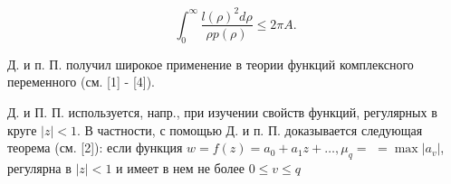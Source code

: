 \documentclass[10pt]{article}
\begin{document}
\[

\int_{0}^{\infty} \frac{l(\rho)^{2} d \rho}{\rho p(\rho)} \leqslant 2 \pi A .

\]



Д. и п. П. получил широкое применение в теории функций комплексного переменного (см. [1] - [4]).



Д. и П. П. используется, напр., при изучении свойств функций, регулярных в круге $|z|<1$. В частности, с помощью Д. и п. П. доказывается следующая теорема (см. [2]): если функция $w=f(z)=a_{0}+a_{1} z+\ldots, \mu_{q}=$ $=\max \left|a_{v}\right|$, регулярна в $|z|<1$ и имеет в нем не более $0 \leqslant v \leqslant q$
\end{document}
